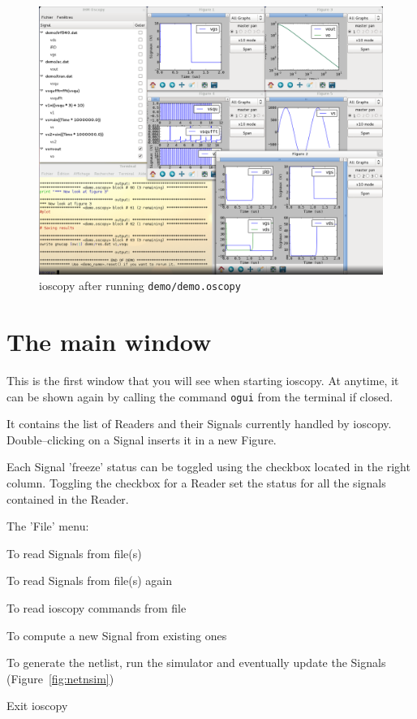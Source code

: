 \documentclass[a4paper,11pt]{report}
\renewenvironment{description}{%
\begin{basedescript}{%
\renewcommand{\makelabel}[1]{\bfseries##1}%
}%
}{%
\end{basedescript}%
}
\begin{document}
\begin{figure}[htbp]
  \centering
  \includegraphics[width=.8\textwidth]{../png/ioscopy.png}
  \caption{ioscopy after running \texttt{demo/demo.oscopy}}
  \label{fig:screenshot}
\end{figure}

\section{The main window}
This is the first window that you will see when starting ioscopy.
At anytime, it can be shown again by calling the command \texttt{ogui} from the terminal if closed.

It contains the list of Readers and their Signals currently handled by ioscopy.
Double--clicking on a Signal inserts it in a new Figure.

Each Signal 'freeze' status can be toggled using the checkbox located in the right column.
Toggling the checkbox for a Reader set the status for all the signals contained in the Reader.

The 'File' menu:
\begin{description}
\item[Add file(s)...] To read Signals from file(s)
\item[Update] To read Signals from file(s) again
\item[Execute script...] To read ioscopy commands from file
\item[New Math Signal] To compute a new Signal from existing ones
\item[Run netlister and simulate] To generate the netlist, run the simulator and eventually update the Signals (Figure~\ref{fig:netnsim})
\item[Quit] Exit ioscopy
\end{description}
\end{document}
